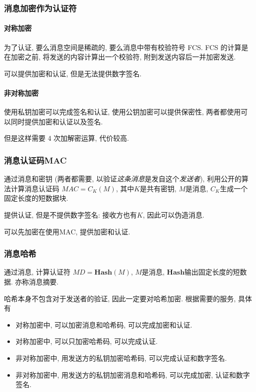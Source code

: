 \documentclass{ctexart}
\begin{document}
\subsubsection{消息加密作为认证符}
\paragraph{对称加密} 为了认证, 要么消息空间是稀疏的, 要么消息中带有校验符号 FCS. 
    FCS 的计算是在加密之前, 将发送的内容计算出一个校验符, 附到发送内容后一并加密发送.\par
    可以提供加密和认证, 但是无法提供数字签名.
\paragraph{非对称加密} 使用私钥加密可以完成签名和认证, 使用公钥加密可以提供保密性,
    两者都使用可以同时提供加密和认证以及签名.\par
    但是这样需要 4 次加解密运算, 代价较高.
\subsubsection{消息认证码MAC}
    通过消息和密钥 (两者都需要, 以验证\emph{这条消息}是发自这个\emph{发送者}),
    利用公开的算法计算消息认证码 $MAC = C_K(M)$,
    其中$K$是共有密钥, $M$是消息, $C_K$生成一个固定长度的短数据块.\par
    提供认证, 但是不提供数字签名: 接收方也有$K$, 因此可以伪造消息.\par
    可以先加密在使用MAC, 提供加密和认证.
\subsubsection{消息哈希}
    通过消息, 计算认证符 $MD = \mathbf{Hash}(M)$, $M$是消息, $\mathbf{Hash}$输出固定长度的短数据. 亦称消息摘要.\par
    哈希本身不包含对于发送者的验证, 因此一定要对哈希加密. 根据需要的服务, 具体有\begin{itemize}
        \item 对称加密中, 可以加密消息和哈希码, 可以完成加密和认证.
        \item 对称加密中, 可以只加密哈希码, 可以完成认证.
        \item 非对称加密中, 用发送方的私钥加密哈希码, 可以完成认证和数字签名.
        \item 非对称加密中, 用发送方的私钥加密消息和哈希码, 可以完成加密, 认证和数字签名.
    \end{itemize}
\end{document}
